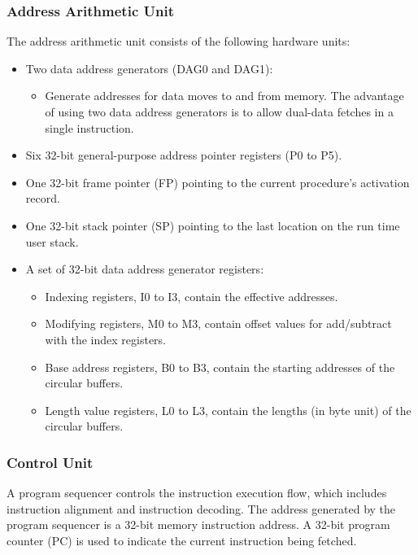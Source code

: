 \subsubsection{Address Arithmetic Unit}
The address arithmetic unit consists of the following hardware units:
\begin{itemize}
	\item Two data address generators (DAG0 and DAG1):
	\begin{itemize}
		\item Generate addresses for data moves to and from memory. The advantage of using two data address generators is to allow dual-data fetches in a single instruction.
	\end{itemize}
	\item Six 32-bit general-purpose address pointer registers (P0 to P5).
	\item One 32-bit frame pointer (FP) pointing to the current procedure's activation record.
	\item One 32-bit stack pointer (SP) pointing to the last location on the run time user stack.
	\item A set of 32-bit data address generator registers:
	\begin{itemize}
		\item Indexing registers, I0 to I3, contain the effective addresses.
		\item Modifying registers, M0 to M3, contain offset values for add/subtract with the index registers.
		\item Base address registers, B0 to B3, contain the starting addresses of the 	circular buffers.
		\item Length value registers, L0 to L3, contain the lengths (in byte unit) of the circular buffers.
	\end{itemize}
\end{itemize}

\subsubsection{Control Unit}
A program sequencer controls the instruction execution flow, which includes
instruction alignment and instruction decoding. The address generated by
the program sequencer is a 32-bit memory instruction address. A 32-bit
program counter (PC) is used to indicate the current instruction being
fetched.


